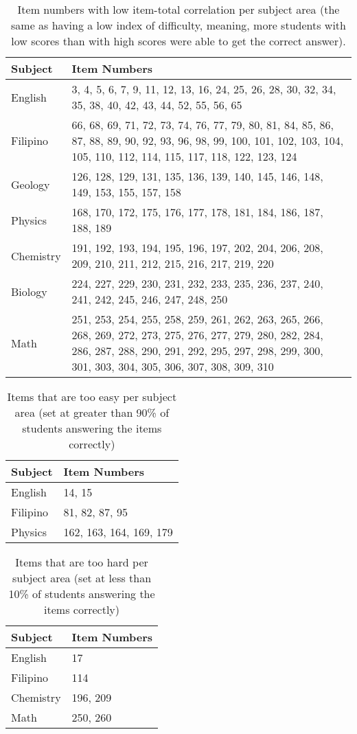 \documentclass[10pt]{apa6}
\begin{document}
\begin{table}
\caption{\label{lowitem} Item numbers with low item-total correlation per subject area (the same as having a low index of difficulty, meaning, more students with low scores than with high scores were able to get the correct answer).}
\begin{tabular}{lp{}}
\toprule
Subject & Item Numbers\\
\midrule
English & 3, 4, 5, 6, 7, 9, 11, 12, 13, 16, 24, 25, 26, 28, 30, 32, 34, 35, 38, 40, 42, 43, 44, 52, 55, 56, 65\\
Filipino & 66, 68, 69, 71, 72, 73, 74, 76, 77, 79, 80, 81, 84, 85, 86, 87, 88, 89, 90, 92, 93, 96, 98, 99, 100, 101, 102, 103, 104, 105, 110, 112, 114, 115, 117, 118, 122, 123, 124\\
Geology & 126, 128, 129, 131, 135, 136, 139, 140, 145, 146, 148, 149, 153, 155, 157, 158\\
Physics & 168, 170, 172, 175, 176, 177, 178, 181, 184, 186, 187, 188, 189\\
Chemistry & 191, 192, 193, 194, 195, 196, 197, 202, 204, 206, 208, 209, 210, 211, 212, 215, 216, 217, 219, 220\\
Biology & 224, 227, 229, 230, 231, 232, 233, 235, 236, 237, 240, 241, 242, 245, 246, 247, 248, 250\\
Math & 251, 253, 254, 255, 258, 259, 261, 262, 263, 265, 266, 268, 269, 272, 273, 275, 276, 277, 279, 280, 282, 284, 286, 287, 288, 290, 291, 292, 295, 297, 298, 299, 300, 301, 303, 304, 305, 306, 307, 308, 309, 310\\
\bottomrule
\end{tabular}
\end{table}

\begin{table}
\caption{\label{tooeasy} Items that are too easy per subject area (set at greater than 90\% of students answering the items correctly)}
\begin{tabular}{lp{}}
\toprule
Subject & Item Numbers \\
\midrule
English & 14, 15\\
Filipino & 81, 82, 87, 95\\
Physics & 162, 163, 164, 169, 179\\
\bottomrule
\end{tabular}
\end{table}

\begin{table}
\caption{\label{toohard} Items that are too hard per subject area (set at less than 10\% of students answering the items correctly)}
\begin{tabular}{lp{}}
\toprule
Subject & Item Numbers \\
\midrule
English & 17\\
Filipino & 114\\
Chemistry & 196, 209\\
Math & 250, 260\\
\bottomrule
\end{tabular}
\end{table}
\end{document}

